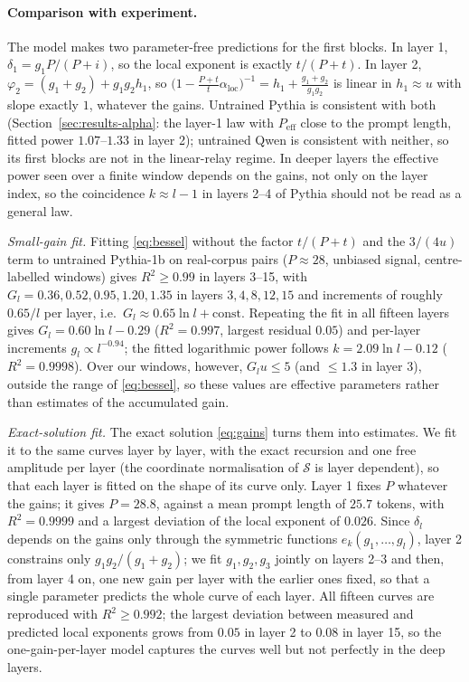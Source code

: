 \documentclass[11pt]{article}
\theoremstyle{definition}
\theoremstyle{remark}
\begin{document}
\paragraph{Comparison with experiment.} The model makes two parameter-free predictions for the first blocks. In layer 1, $\delta_1=g_1P/(P+i)$, so the local exponent is exactly $t/(P+t)$. In layer 2, $\varphi_2=(g_1+g_2)+g_1g_2h_1$, so $\big(1-\tfrac{P+t}{t}\alpha_{\mathrm{loc}}\big)^{-1}=h_1+\tfrac{g_1+g_2}{g_1g_2}$ is linear in $h_1\approx u$ with slope exactly $1$, whatever the gains. Untrained Pythia is consistent with both (Section~\ref{sec:results-alpha}: the layer-1 law with $P_{\mathrm{eff}}$ close to the prompt length, fitted power $1.07$--$1.33$ in layer 2); untrained Qwen is consistent with neither, so its first blocks are not in the linear-relay regime. In deeper layers the effective power seen over a finite window depends on the gains, not only on the layer index, so the coincidence $k\approx l-1$ in layers 2--4 of Pythia should not be read as a general law.

\emph{Small-gain fit.} Fitting \eqref{eq:bessel} without the factor $t/(P+t)$ and the $3/(4u)$ term to untrained Pythia-1b on real-corpus pairs ($P\approx28$, unbiased signal, centre-labelled windows) gives $R^2\ge0.99$ in layers 3--15, with $G_l=0.36,0.52,0.95,1.20,1.35$ in layers $3,4,8,12,15$ and increments of roughly $0.65/l$ per layer, i.e.\ $G_l\approx0.65\ln l+\mathrm{const}$. Repeating the fit in all fifteen layers gives $G_l=0.60\ln l-0.29$ ($R^2=0.997$, largest residual $0.05$) and per-layer increments $g_l\propto l^{-0.94}$; the fitted logarithmic power follows $k=2.09\ln l-0.12$ ($R^2=0.9998$). Over our windows, however, $G_lu\le5$ (and $\le1.3$ in layer 3), outside the range of \eqref{eq:bessel}, so these values are effective parameters rather than estimates of the accumulated gain.

\emph{Exact-solution fit.} The exact solution \eqref{eq:gains} turns them into estimates. We fit it to the same curves layer by layer, with the exact recursion and one free amplitude per layer (the coordinate normalisation of $\mathcal S$ is layer dependent), so that each layer is fitted on the shape of its curve only. Layer 1 fixes $P$ whatever the gains; it gives $P=28.8$, against a mean prompt length of $25.7$ tokens, with $R^2=0.9999$ and a largest deviation of the local exponent of $0.026$. Since $\delta_l$ depends on the gains only through the symmetric functions $e_k(g_1,\dots,g_l)$, layer 2 constrains only $g_1g_2/(g_1+g_2)$; we fit $g_1,g_2,g_3$ jointly on layers 2--3 and then, from layer 4 on, one new gain per layer with the earlier ones fixed, so that a single parameter predicts the whole curve of each layer. All fifteen curves are reproduced with $R^2\ge0.992$; the largest deviation between measured and predicted local exponents grows from $0.05$ in layer 2 to $0.08$ in layer 15, so the one-gain-per-layer model captures the curves well but not perfectly in the deep layers.
\end{document}
